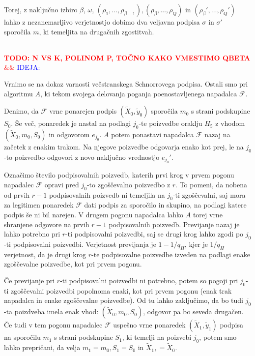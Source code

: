 \documentclass[isrm2, tisk]{fmfdelo}
\newcommand{\todo}[2][]{%
    \textcolor{red}{%
        \\ \textbf{\uppercase{todo: #2}}%
        \\%
        \ifx&#1&%
        \else%
            \textcolor{blue}{\uppercase{ideja:} #1}%
            \\%
        \fi%
    }%
}
\begin{document}
\begin{dokaz}
    Torej, z naključno izbiro $\beta$, $\omega$, $(\rho_1, \dots, \rho_{\beta - 1}), (\rho_\beta, 
    \dots, \rho_Q)$ in $(\rho_\beta', \dots, \rho_Q')$ lahko z nezanemarljivo verjetnostjo dobimo
    dva veljavna podpisa $\sigma$ in $\sigma'$ sporočila $m$, ki temeljita na drugačnih zgostitvah.

    \todo{n vs k, polinom P, točno kako vmestimo Qbeta}
\end{dokaz}

Vrnimo se na dokaz varnosti večstranskega Schnorrovega podpisa. Ostali smo pri algoritmu $A$, ki
tekom svojega delovanja poganja poenostavljenega napadalca $\mathcal{F}$. 

Denimo, da $\mathcal{F}$ vrne ponarejen podpis $(\tilde{X}_0, \tilde{y}_0)$ sporočila $m_0$ s strani 
podskupine $S_0$. Še več, ponaredek je nastal na podlagi $j_0$-te poizvedbe oraklju $H_5$ z vhodom 
$(\tilde{X}_0, m_0, S_0)$ in odgovorom $e_{j_0}$. $A$ potem ponastavi napadalca $\mathcal{F}$ nazaj
na začetek z enakim trakom. Na njegove poizvedbe odgovarja enako kot prej, le na $j_0$-to poizvedbo
odgovori z novo naključno vrednostjo $e_{j_0}'$.

Označimo število podpisovalnih poizvedb, katerih prvi krog v prvem pogonu napadalec $\mathcal{F}$ 
opravi pred $j_0$-to zgoščevalno poizvedbo z $r$. To pomeni, da nobena od prvih $r - 1$ podpisovalnih 
poizvedb ni temeljila na $j_0$-ti zgoščevalni, saj mora za legitimen ponaredek $\mathcal{F}$ dati 
podpis za sporočilo in skupino, na podlagi katere podpis še ni bil narejen. V drugem pogonu napadalca
lahko $A$ torej vrne shranjene odgovore na prvih $r - 1$ podpisovalnih poizvedb. Previjanje nazaj 
je lahko potrebno pri $r$-ti podpisovalni poizvedbi, saj se drugi krog lahko zgodi po $j_0$-ti
podpisovalni poizvedbi. Verjetnost previjanja je $1 - 1/q_H$, kjer je $1/q_H$ verjetnost, da je
drugi krog $r$-te podpisovalne poizvedbe izveden na podlagi enake zgoščevalne poizvedbe, kot pri
prvem pogonu.

Če previjanje pri $r$-ti podpisovalni poizvedbi ni potrebno, potem so pogoji pri $j_0$-ti zgoščevalni
poizvedbi popolnoma enaki, kot pri prvem pogonu (enak trak napadalca in enake zgoščevalne poizvedbe).
Od tu lahko zaključimo, da bo tudi $j_0$-ta poizdveba imela enak vhod: $(\tilde{X}_0, m_0, S_0)$, 
odgovor pa bo seveda drugačen. Če tudi v tem pogonu napadalec $\mathcal{F}$ uspešno vrne ponaredek
$(\tilde{X}_1, \tilde{y}_1)$ podpisa na sporočilu $m_1$ s strani podskupine $S_1$, ki temelji na 
poizvebi $j_0$, potem smo lahko prepričani, da velja $m_1 = m_0, S_1 = S_0$ in $\tilde{X}_1, = \tilde{X}_0$.
\end{document}
